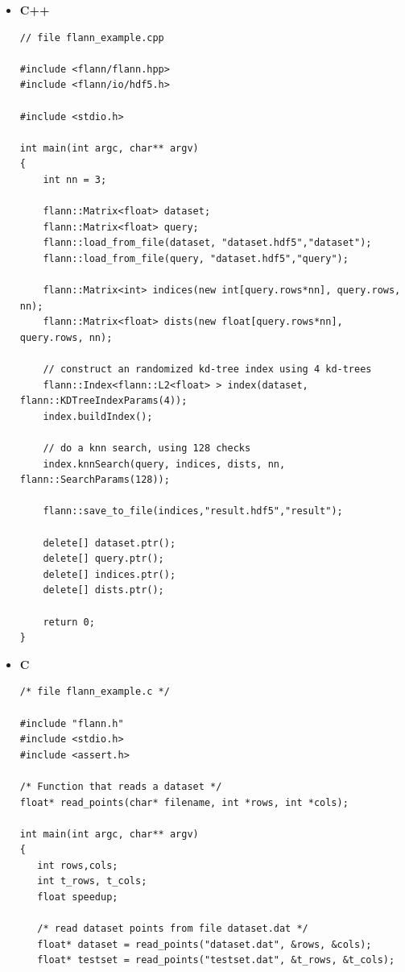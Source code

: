 \documentclass[letter,10pt]{article}
\begin{document}
\begin{itemize}


\item \textbf{C++}
\begin{Verbatim}[fontsize=\scriptsize,frame=single]
// file flann_example.cpp

#include <flann/flann.hpp>
#include <flann/io/hdf5.h>

#include <stdio.h>

int main(int argc, char** argv)
{
    int nn = 3;

    flann::Matrix<float> dataset;
    flann::Matrix<float> query;
    flann::load_from_file(dataset, "dataset.hdf5","dataset");
    flann::load_from_file(query, "dataset.hdf5","query");

    flann::Matrix<int> indices(new int[query.rows*nn], query.rows, nn);
    flann::Matrix<float> dists(new float[query.rows*nn], query.rows, nn);

    // construct an randomized kd-tree index using 4 kd-trees
    flann::Index<flann::L2<float> > index(dataset, flann::KDTreeIndexParams(4));
    index.buildIndex();                                                                                               

    // do a knn search, using 128 checks
    index.knnSearch(query, indices, dists, nn, flann::SearchParams(128));

    flann::save_to_file(indices,"result.hdf5","result");

    delete[] dataset.ptr();
    delete[] query.ptr();
    delete[] indices.ptr();
    delete[] dists.ptr();
    
    return 0;
}

\end{Verbatim}


\item \textbf{C}
\begin{Verbatim}[fontsize=\scriptsize,frame=single]
/* file flann_example.c */

#include "flann.h"
#include <stdio.h>
#include <assert.h>

/* Function that reads a dataset */
float* read_points(char* filename, int *rows, int *cols);

int main(int argc, char** argv)
{
   int rows,cols;
   int t_rows, t_cols;
   float speedup;

   /* read dataset points from file dataset.dat */
   float* dataset = read_points("dataset.dat", &rows, &cols);
   float* testset = read_points("testset.dat", &t_rows, &t_cols);


\end{Verbatim}
\end{itemize}
\end{document}
